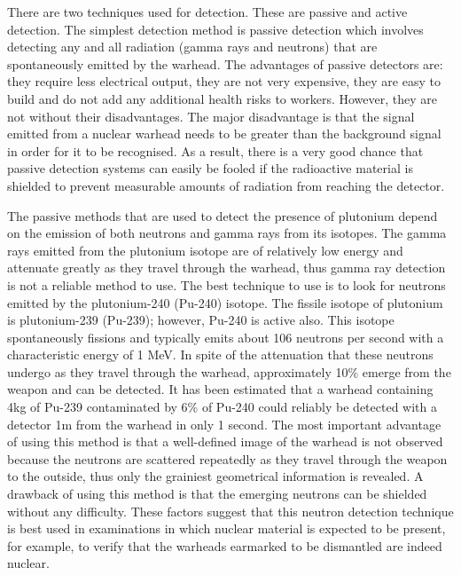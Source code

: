 \documentclass[twoside,titlepage,11pt,twocolumn,a4paper]{article}
\begin{document}
There are two techniques used for detection. These are passive and
active detection. The simplest detection method is passive detection
which involves detecting any and all radiation (gamma rays and
neutrons) that are spontaneously emitted by the
warhead. \citep{hippel1990} The advantages of passive detectors are:
they require less electrical output, they are not very expensive, they
are easy to build and do not add any additional health risks to
workers. However, they are not without their disadvantages. The major
disadvantage is that the signal emitted from a nuclear warhead needs
to be greater than the background signal in order for it to be
recognised. As a result, there is a very good chance that passive
detection systems can easily be fooled if the radioactive material is
shielded to prevent measurable amounts of radiation from reaching the
detector. \citep{nuclearDetArch2009}

The passive methods that are used to detect the presence of plutonium
depend on the emission of both neutrons and gamma rays from its
isotopes. The gamma rays emitted from the plutonium isotope are of
relatively low energy and attenuate greatly as they travel through the
warhead, thus gamma ray detection is not a reliable method to use. The
best technique to use is to look for neutrons emitted by the
plutonium-240 (Pu-240) isotope. The fissile isotope of plutonium is
plutonium-239 (Pu-239); however, Pu-240 is active also.
\citep{drell1993} This isotope spontaneously fissions and typically
emits about 106 neutrons per second with a characteristic energy of 1
MeV. \citep{drell1993} In spite of the attenuation that these neutrons
undergo as they travel through the warhead, approximately 10\% emerge
from the weapon and can be detected. It has been estimated that a
warhead containing 4kg of Pu-239 contaminated by 6\% of Pu-240 could
reliably be detected with a detector 1m from the warhead in only 1
second. \citep{drell1993} The most important advantage of using this
method is that a well-defined image of the warhead is not observed
because the neutrons are scattered repeatedly as they travel through
the weapon to the outside, thus only the grainiest geometrical
information is revealed. \citep{drell1993,drell1990} A drawback of
using this method is that the emerging neutrons can be shielded
without any difficulty. These factors suggest that this neutron
detection technique is best used in examinations in which nuclear
material is expected to be present, for example, to verify that the
warheads earmarked to be dismantled are indeed nuclear.
\end{document}
